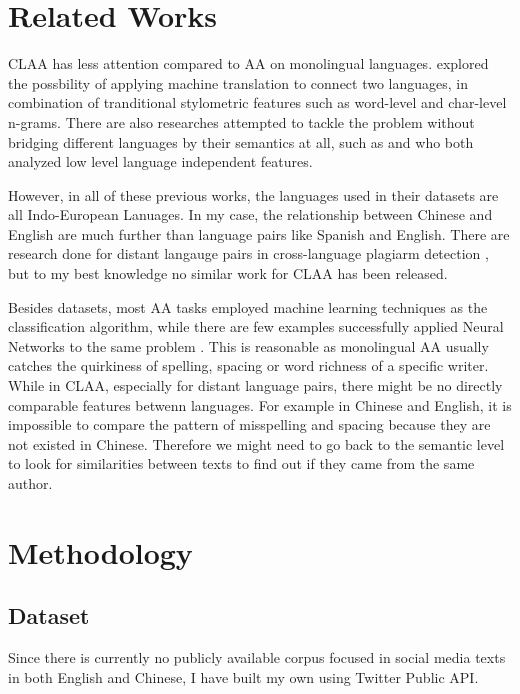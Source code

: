 \documentclass[11pt,a4paper]{article}
\begin{document}
\section{Related Works}\label{sec:related-work}

CLAA has less attention compared to AA on monolingual languages. \citet{bogdanova2014cross} explored the possbility of applying machine translation to connect two languages, in combination of tranditional stylometric features such as word-level and char-level n-grams. There are also researches attempted to tackle the problem without bridging different languages by their semantics at all, such as \citet{llorens2016deep} and \citet{sarwar2018scalable} who both analyzed low level language independent features.

However, in all of these previous works, the languages used in their datasets are all Indo-European Lanuages. In my case, the relationship between Chinese and English are much further than language pairs like Spanish and English. There are research done for distant langauge pairs in cross-language plagiarm detection \cite{barron2010plagiarism}, but to my best knowledge no similar work for CLAA has been released.

Besides datasets, most AA tasks employed machine learning techniques as the classification algorithm, while there are few examples successfully applied Neural Networks to the same problem \cite{shrestha2017convolutional}. This is reasonable as monolingual AA usually catches the quirkiness of spelling, spacing or word richness of a specific writer. While in CLAA, especially for distant language pairs, there might be no directly comparable features betwenn languages. For example in Chinese and English, it is impossible to compare the pattern of misspelling and spacing because they are not existed in Chinese. Therefore we might need to go back to the semantic level to look for similarities between texts to find out if they came from the same author.

\section{Methodology}\label{sec:method}

\subsection{Dataset}

Since there is currently no publicly available corpus focused in social media texts in both English and Chinese, I have built my own using Twitter Public API.
\end{document}
